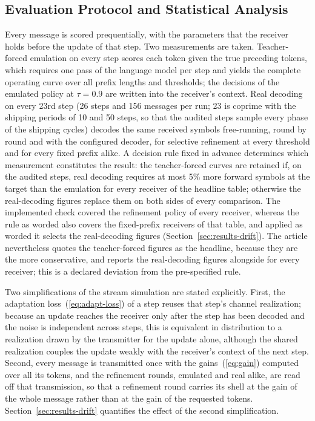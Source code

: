 \subsection{Evaluation Protocol and Statistical Analysis}
\label{sec:setup-protocol}

Every message is scored prequentially, with the parameters that the receiver holds before the update of that step. Two measurements are taken. Teacher-forced emulation on every step scores each token given the true preceding tokens, which requires one pass of the language model per step and yields the complete operating curve over all prefix lengths and thresholds; the decisions of the emulated policy at $\tau = 0.9$ are written into the receiver's context. Real decoding on every 23rd step (26 steps and 156 messages per run; 23 is coprime with the shipping periods of 10 and 50 steps, so that the audited steps sample every phase of the shipping cycles) decodes the same received symbols free-running, round by round and with the configured decoder, for selective refinement at every threshold and for every fixed prefix alike. A decision rule fixed in advance determines which measurement constitutes the result: the teacher-forced curves are retained if, on the audited steps, real decoding requires at most 5\% more forward symbols at the target than the emulation for every receiver of the headline table; otherwise the real-decoding figures replace them on both sides of every comparison. The implemented check covered the refinement policy of every receiver, whereas the rule as worded also covers the fixed-prefix receivers of that table, and applied as worded it selects the real-decoding figures (Section~\ref{sec:results-drift}). The article nevertheless quotes the teacher-forced figures as the headline, because they are the more conservative, and reports the real-decoding figures alongside for every receiver; this is a declared deviation from the pre-specified rule.

Two simplifications of the stream simulation are stated explicitly. First, the adaptation loss~(\ref{eq:adapt-loss}) of a step reuses that step's channel realization; because an update reaches the receiver only after the step has been decoded and the noise is independent across steps, this is equivalent in distribution to a realization drawn by the transmitter for the update alone, although the shared realization couples the update weakly with the receiver's context of the next step. Second, every message is transmitted once with the gains~(\ref{eq:gain}) computed over all its tokens, and the refinement rounds, emulated and real alike, are read off that transmission, so that a refinement round carries its shell at the gain of the whole message rather than at the gain of the requested tokens. Section~\ref{sec:results-drift} quantifies the effect of the second simplification.

